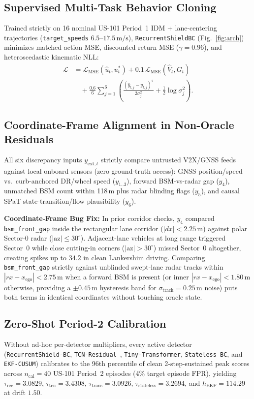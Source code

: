 \documentclass[journal]{IEEEtran}
\begin{document}
\subsection{Supervised Multi-Task Behavior Cloning}
Trained strictly on 16 nominal US-101 Period~1 IDM + lane-centering trajectories (\texttt{target\_speeds} $6.5\text{--}17.5\,\text{m/s}$), \texttt{RecurrentShieldBC} (Fig.~\ref{fig:arch}) minimizes matched action MSE, discounted return MSE ($\gamma=0.96$), and heteroscedastic kinematic NLL:
\begin{align}
\mathcal{L} &= \mathcal{L}_{\text{MSE}}(\hat{u}_t, u_t^*) + 0.1\,\mathcal{L}_{\text{MSE}}(\hat{V}_t, G_t) \nonumber\\
&\quad + \frac{0.6}{6}\sum_{j=1}^6 \left(\frac{(\hat{y}_{t,j}-y_{t,j})^2}{2\sigma_j^2} + \frac{1}{2}\log\sigma_j^2\right).
\end{align}

\subsection{Coordinate-Frame Alignment in Non-Oracle Residuals}
All six discrepancy inputs $y_{\text{ext},t}$ strictly compare untrusted V2X/GNSS feeds against local onboard sensors (zero ground-truth access): GNSS position/speed vs.\ curb-anchored DR/wheel speed ($y_{1..3}$), forward BSM-vs-radar gap ($y_4$), unmatched BSM count within 118\,m plus radar blinding flags ($y_5$), and causal SPaT state-transition/flow plausibility ($y_6$).

\textbf{Coordinate-Frame Bug Fix:} In prior corridor checks, $y_4$ compared \texttt{bsm\_front\_gap} inside the rectangular lane corridor ($|dx|<2.25\,\text{m}$) against polar Sector-0 radar ($|\text{az}| \le 30^\circ$). Adjacent-lane vehicles at long range triggered Sector~0 while close cutting-in corners ($|\text{az}| > 30^\circ$) missed Sector~0 altogether, creating spikes up to $34.2$ in clean Lankershim driving. Comparing \texttt{bsm\_front\_gap} strictly against unblinded swept-lane radar tracks within $|rx - x_{\text{ego}}| < 2.75\,\text{m}$ when a forward BSM is present (or inner $|rx - x_{\text{ego}}| < 1.80\,\text{m}$ otherwise, providing a $\pm 0.45\,\text{m}$ hysteresis band for $\sigma_{\text{track}}=0.25\,\text{m}$ noise) puts both terms in identical coordinates without touching oracle state.

\subsection{Zero-Shot Period-2 Calibration}
Without ad-hoc per-detector multipliers, every active detector (\texttt{RecurrentShield-BC}, \texttt{TCN-Residual}~\cite{bai2018tcn}, \texttt{Tiny-Transformer}, \texttt{Stateless BC}, and \texttt{EKF-CUSUM}) calibrates to the 96th percentile of clean 2-step-sustained peak scores across $n_{\text{cal}}=40$ US-101 Period~2 episodes (4\% target episode FPR), yielding $\tau_{\text{rec}}=3.0829$, $\tau_{\text{tcn}}=3.4308$, $\tau_{\text{trans}}=3.0926$, $\tau_{\text{stateless}}=3.2694$, and $h_{\text{EKF}}=114.29$ at drift $1.50$.
\end{document}

